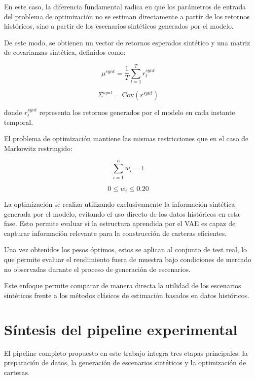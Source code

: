 En este caso, la diferencia fundamental radica en que los parámetros de entrada del problema de optimización no se estiman directamente a partir de los retornos históricos, sino a partir de los escenarios sintéticos generados por el modelo.

De este modo, se obtienen un vector de retornos esperados sintético y una matriz de covarianzas sintética, definidos como:

\begin{equation}
\mu^{synt} = \frac{1}{T} \sum_{t=1}^{T} r_t^{synt}
\end{equation}

\begin{equation}
\Sigma^{synt} = \text{Cov}(r^{synt})
\end{equation}

donde $r_t^{synt}$ representa los retornos generados por el modelo en cada instante temporal.

El problema de optimización mantiene las mismas restricciones que en el caso de Markowitz restringido:

\begin{equation}
\sum_{i=1}^{n} w_i = 1
\end{equation}

\begin{equation}
0 \leq w_i \leq 0.20
\end{equation}

La optimización se realiza utilizando exclusivamente la información sintética generada por el modelo, evitando el uso directo de los datos históricos en esta fase. Esto permite evaluar si la estructura aprendida por el VAE es capaz de capturar información relevante para la construcción de carteras eficientes.

Una vez obtenidos los pesos óptimos, estos se aplican al conjunto de test real, lo que permite evaluar el rendimiento fuera de muestra bajo condiciones de mercado no observadas durante el proceso de generación de escenarios.

Este enfoque permite comparar de manera directa la utilidad de los escenarios sintéticos frente a los métodos clásicos de estimación basados en datos históricos.

\section{Síntesis del pipeline experimental}

El pipeline completo propuesto en este trabajo integra tres etapas principales: la preparación de datos, la generación de escenarios sintéticos y la optimización de carteras.

